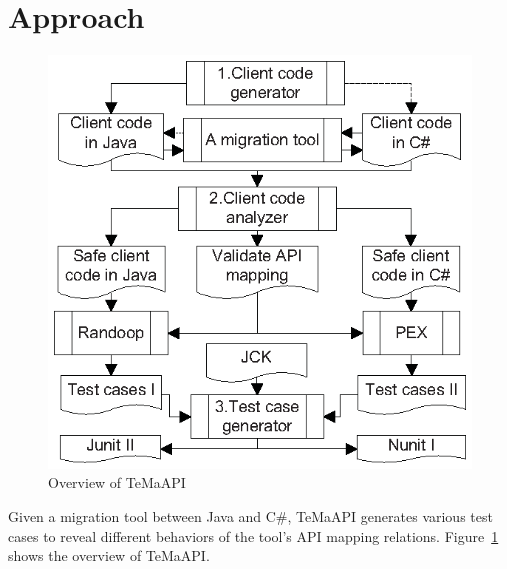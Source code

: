 \section{Approach}
\label{sec:approach}
\begin{figure}[t]
\centering
\includegraphics[scale=1,clip]{figure/approach.eps}\vspace*{-3ex}
 \caption{Overview of TeMaAPI}\vspace*{-4ex}
 \label{fig:approach}
\end{figure}
Given a migration tool between Java and C\#, TeMaAPI generates various test cases to reveal different behaviors of the tool's API mapping relations.
Figure~\ref{fig:approach} shows the overview of TeMaAPI.


